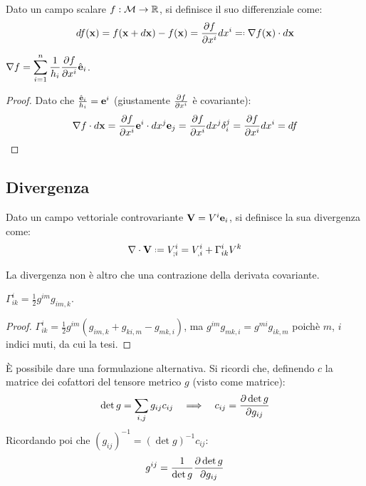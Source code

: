 \begin{definition}
	Dato  un campo scalare $ f : \mathcal{M} \rightarrow \mathbb{R} $, si definisce il suo differenziale come:
	\begin{equation}
		df(\ve{x}) = f(\ve{x} + d\ve{x}) - f(\ve{x}) = \frac{\pa f}{\pa x^i}dx^i \eqdef \nabla f(\ve{x}) \cdot d\ve{x}
		\label{eq:4.17}
	\end{equation}
\end{definition}

\begin{proposition}
	$ \nabla f = \displaystyle\sum_{i = 1}^{n} \frac{1}{h_i} \frac{\partial f}{\partial x^i} \hat{\mathbf{e}}_i $.
\end{proposition}
\begin{proof}
	Dato che $ \frac{\hat{\mathbf{e}}_i}{h_i} = \mathbf{e}^i $ (giustamente $ \frac{\partial f}{\partial x^i} $ è covariante):
	\begin{equation*}
		\nabla f \cdot d\mathbf{x} = \frac{\partial f}{\partial x^i} \mathbf{e}^i \cdot dx^j \mathbf{e}_j = \frac{\partial f}{\partial x^i} dx^j \delta^j_i = \frac{\partial f}{\partial x^i} dx^i = df
	\end{equation*}
\end{proof}

\subsection{Divergenza}

\begin{definition}
	Dato un campo vettoriale controvariante $ \mathbf{V} = V^i \mathbf{e}_i $, si definisce la sua divergenza come:
	\begin{equation}
		\nabla\cdot\ve{V} \defeq V^i_{;i} = V^i_{,i} + \Gamma^i_{ik} V^k
		\label{eq:4.18}
	\end{equation}
\end{definition}

La divergenza non è altro che una contrazione della derivata covariante.

\begin{proposition}\label{chri-contr}
	$ \Gamma^i_{ik} = \frac{1}{2} g^{im} g_{im,k} $.
\end{proposition}
\begin{proof}
	$ \Gamma^i_{ik} = \frac{1}{2} g^{im} \left( g_{im,k} + g_{ki,m} - g_{mk,i} \right) $, ma $ g^{im} g_{mk,i} = g^{mi} g_{ik,m} $ poichè $ m $, $ i $ indici muti, da cui la tesi.
\end{proof}

È possibile dare una formulazione alternativa. Si ricordi che, definendo $ c $ la matrice dei cofattori del tensore metrico $ g $ (visto come matrice):
\begin{equation}
	\det g = \sum_{i,j} g_{ij} c_{ij} \quad \Longrightarrow \quad c_{ij} = \frac{\partial\det g}{\partial g_{ij}}
	\label{eq:4.19}
\end{equation}
Ricordando poi che $ \left( g_{ij} \right)^{-1} = \left( \det g \right)^{-1} c_{ij} $:
\begin{equation}
	g^{ij} = \frac{1}{\det g} \frac{\partial\det g}{\partial g_{ij}}
	\label{eq:4.20}
\end{equation}

